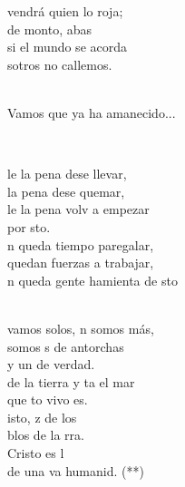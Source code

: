 \documentclass[12pt]{article}
\begin{document}
\begin{multicols*}{2}
\begin{cancion}
	 vendrá quien lo roja;\\
	de monto, abas\\
	si el mundo se acorda\\
	sotros no callemos.\\\jump\\
	\begin{chorus}%
Vamos que ya ha amanecido...\\
	\end{chorus}%
	\jump\\
\end{cancion}%

\begin{cancion}%
	le la pena dese llevar,\\
	 la pena dese quemar,\\
	le la pena volv a empezar \\
	por sto. \\
	n queda tiempo paregalar, \\
	 quedan fuerzas a trabajar,\\
	n queda gente hamienta de sto\\\jump\\
	\begin{chorus}%
	 vamos solos, n somos más,\\
	somos s de antorchas \\
	y un  de verdad.\\
	de la tierra y ta el mar\\
	que to vivo es. \\
	isto, z de los \\
	blos de la rra.\\
	Cristo es l \\
	de una va humanid. (**)\\
	\end{chorus}%

\end{cancion}
\end{multicols*}
\end{document}
